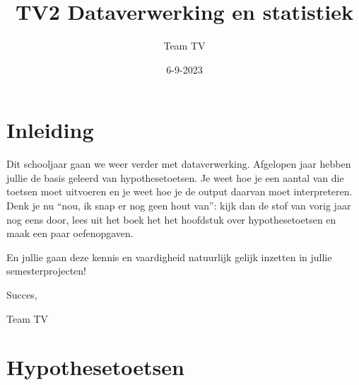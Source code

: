 \documentclass[
  letterpaper,
  DIV=11,
  numbers=noendperiod]{scrreprt}
\title{TV2 Dataverwerking en statistiek}
\author{Team TV}
\date{6-9-2023}
\renewcommand*\contentsname{Table of contents}
\newcommand\contentsname{Table of contents}
\theoremstyle{definition}
\theoremstyle{remark}
\begin{document}
\maketitle
\ifdefined\Shaded\renewenvironment{Shaded}{\begin{tcolorbox}[enhanced, borderline west={3pt}{0pt}{shadecolor}, interior hidden, breakable, sharp corners, frame hidden, boxrule=0pt]}{\end{tcolorbox}}\fi

\renewcommand*\contentsname{Table of contents}
{
\hypersetup{linkcolor=}
\setcounter{tocdepth}{2}
\tableofcontents
}

\hypertarget{inleiding}{%
\chapter*{Inleiding}\label{inleiding}}

Dit schooljaar gaan we weer verder met dataverwerking. Afgelopen jaar
hebben jullie de basis geleerd van hypothesetoetsen. Je weet hoe je een
aantal van die toetsen moet uitvoeren en je weet hoe je de output
daarvan moet interpreteren. Denk je nu ``nou, ik snap er nog geen hout
van'': kijk dan de stof van vorig jaar nog eens door, lees uit het boek
het het hoofdstuk over hypothesetoetsen en maak een paar oefenopgaven.

En jullie gaan deze kennis en vaardigheid natuurlijk gelijk inzetten in
jullie semesterprojecten!

Succes,

Team TV


\hypertarget{hypothesetoetsen}{%
\chapter{Hypothesetoetsen}\label{hypothesetoetsen}}
\end{document}
